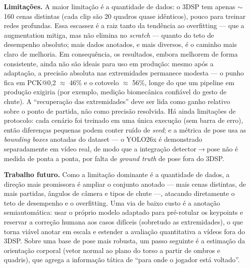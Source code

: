 \documentclass[12pt]{article}
\begin{document}
\textbf{Limitações.} A maior limitação é a quantidade de dados: o 3DSP tem apenas $\sim$160 cenas distintas (cada clip são 20 quadros quase idênticos), pouco para treinar redes profundas. Essa escassez é a raiz tanto da tendência ao overfitting --- que a augmentation mitiga, mas não elimina no \emph{scratch} --- quanto do teto de desempenho absoluto; mais dados anotados, e mais diversos, é o caminho mais claro de melhoria. Em consequência, os resultados, embora melhorem de forma consistente, ainda não são ideais para uso em produção: mesmo após a adaptação, a precisão absoluta nas extremidades permanece modesta --- o punho fica em PCK@0,2 $\approx$ 46\% e o cotovelo $\approx$ 56\%, longe do que um pipeline em produção exigiria (por exemplo, medição biomecânica confiável do gesto de chute). A ``recuperação das extremidades'' deve ser lida como ganho relativo sobre o ponto de partida, não como precisão resolvida. Há ainda limitações de protocolo: cada cenário foi treinado em uma única execução (sem barra de erro), então diferenças pequenas podem conter ruído de \emph{seed}; e a métrica de pose usa as \emph{bounding boxes} anotadas do dataset --- o YOLO26x é demonstrado separadamente em vídeo real, de modo que a integração detector$\rightarrow$pose não é medida de ponta a ponta, por falta de \emph{ground truth} de pose fora do 3DSP.

\textbf{Trabalho futuro.} Como a limitação dominante é a quantidade de dados, a direção mais promissora é ampliar o conjunto anotado --- mais cenas distintas, de mais partidas, ângulos de câmera e tipos de chute ---, atacando diretamente o teto de desempenho e o overfitting. Uma via de baixo custo é a anotação semiautomática: usar o próprio modelo adaptado para pré-rotular os keypoints e reservar a correção humana aos casos difíceis (sobretudo as extremidades), o que torna viável anotar em escala e estender a avaliação quantitativa a vídeos fora do 3DSP. Sobre uma base de pose mais robusta, um passo seguinte é a estimação da orientação corporal (vetor normal ao plano do torso a partir de ombros e quadris), que agrega a informação tática de ``para onde o jogador está voltado''.



\end{document}
